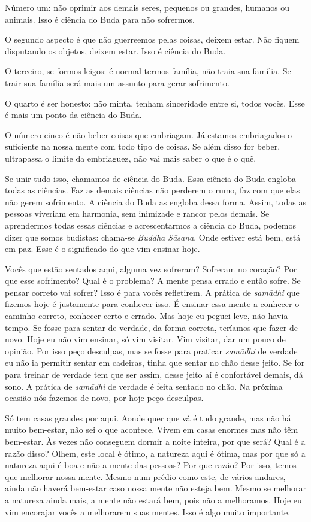 Número um: não oprimir aos demais seres, pequenos ou grandes,
humanos ou animais. Isso é ciência do Buda para não sofrermos.

O segundo aspecto é que não guerreemos pelas coisas, deixem estar.
Não fiquem disputando os objetos, deixem estar. Isso é ciência do Buda.

O terceiro, se formos leigos: é normal termos família, não traia sua
família. Se trair sua família será mais um assunto para gerar
sofrimento.

O quarto é ser honesto: não minta, tenham sinceridade entre si,
todos vocês. Esse é mais um ponto da ciência do Buda.

O número cinco é não beber coisas que embriagam. Já estamos
embriagados o suficiente na nossa mente com todo tipo de coisas. Se
além disso for beber, ultrapassa o limite da embriaguez, não vai mais
saber o que é o quê. 

Se unir tudo isso, chamamos de ciência do Buda. Essa ciência do Buda
engloba todas as ciências. Faz as demais ciências não perderem o rumo,
faz com que elas não gerem sofrimento. A ciência do Buda as engloba
dessa forma. Assim, todas as pessoas viveriam em harmonia, sem
inimizade e rancor pelos demais. Se aprendermos todas essas ciências e
acrescentarmos a ciência do Buda, podemos dizer que somos budistas:
chama-se \textit{Buddha Sāsana}. Onde estiver está bem, está em paz.
Esse é o significado do que vim ensinar hoje.

Vocês que estão sentados aqui, alguma vez sofreram? Sofreram no
coração? Por que esse sofrimento? Qual é o problema? A mente pensa
errado e então sofre. Se pensar correto vai sofrer? Isso é para vocês
refletirem. A prática de \textit{samādhi} que fizemos hoje é
justamente para conhecer isso. É ensinar essa mente a conhecer o
caminho correto, conhecer certo e errado. Mas hoje eu peguei leve, não
havia tempo. Se fosse para sentar de verdade, da forma correta,
teríamos que fazer de novo. Hoje eu não vim ensinar, só vim visitar.
Vim visitar, dar um pouco de opinião. Por isso peço desculpas, mas se
fosse para praticar \textit{samādhi} de verdade eu não ia permitir
sentar em cadeiras, tinha que sentar no chão desse jeito. Se for para
treinar de verdade tem que ser assim, desse jeito aí é confortável
demais, dá sono. A prática de \textit{samādhi} de verdade é feita
sentado no chão. Na próxima ocasião nós fazemos de novo, por hoje peço
desculpas.

Só tem casas grandes por aqui. Aonde quer que vá é tudo grande, mas
não há muito bem-estar, não sei o que acontece. Vivem em casas enormes
mas não têm bem-estar. Às vezes não conseguem dormir a noite inteira,
por que será? Qual é a razão disso? Olhem, este local é ótimo, a
natureza aqui é ótima, mas por que só a natureza aqui é boa e não a
mente das pessoas? Por que razão? Por isso, temos que melhorar nossa
mente. Mesmo num prédio como este, de vários andares, ainda não haverá
bem-estar caso nossa mente não esteja bem. Mesmo se melhorar a natureza
ainda mais, a mente não estará bem, pois não a melhoramos. Hoje eu vim
encorajar vocês a melhorarem suas mentes. Isso é algo muito importante.


